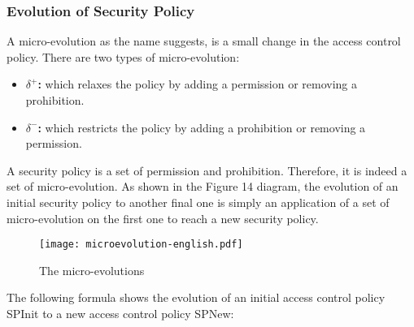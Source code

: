 \documentclass{acm_proc_article-sp}
\begin{document}
\subsubsection{Evolution of Security Policy}
A micro-evolution as the name suggests, is a small change in the access control policy. There are two types of micro-evolution:
\begin{itemize}
 \item \textbf{$\delta^{+}$:} which relaxes the policy by adding a permission or removing a prohibition.
 \item \textbf{$\delta^{-}$:} which restricts the policy by adding a prohibition or removing a permission.
\end{itemize}
A security policy is a set of permission and prohibition. Therefore, it is indeed a set of micro-evolution. As shown in the Figure 14 diagram, the evolution of an initial security policy to another final one is simply an application of a set of micro-evolution on the first one to reach a new security policy.
\newpage                                                                   \begin{figure}[h!]                                                          \centering                                                                  \texttt{[image: microevolution-english.pdf]}\caption{The micro-evolutions}                                              \label{The micro-evolutions}                                                \end{figure}                                                                

The following formula shows the evolution of an initial access control policy SPInit to a new access control policy SPNew:\\

\\
\end{document}
